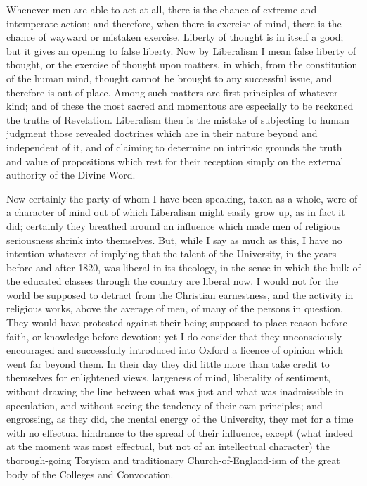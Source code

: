 Whenever men are able to act at all, there is the chance of extreme
and intemperate action; and therefore, when there is exercise of mind,
there is the chance of wayward or mistaken exercise. Liberty of thought
is in itself a good; but it gives an opening to false liberty. Now by
Liberalism I mean false liberty of thought, or the exercise of thought
upon matters, in which, from the constitution of the human mind, thought
cannot be brought to any successful issue, and therefore is out of
place. Among such matters are first principles of whatever kind; and of
these the most sacred and momentous are especially to be reckoned the
truths of Revelation. Liberalism then is the mistake of subjecting to
human judgment those revealed doctrines which are in their nature beyond
and independent of it, and of claiming to determine on intrinsic grounds
the truth and value of propositions which rest for their reception
simply on the external authority of the Divine Word.

Now certainly the party of whom I have been speaking, taken as a
whole, were of a character of mind out of which Liberalism might
easily grow up, as in fact it did; certainly they breathed around an
influence which made men of religious seriousness shrink into
themselves. But, while I say as much as this, I have no intention
whatever of implying that the talent of the University, in the years
before and after 1820, was liberal in its theology, in the sense in
which the bulk of the educated classes through the country are liberal
now. I would not for the world be supposed to detract from the Christian
earnestness, and the activity in religious works, above the average of
men, of many of the persons in question. They would have protested
against their being supposed to place reason before faith, or knowledge
before devotion; yet I do consider that they unconsciously encouraged
and successfully introduced into Oxford a licence of opinion which went
far beyond them. In their day they did little more than take credit to
themselves for enlightened views, largeness of mind, liberality of
sentiment, without drawing the line between what was just and what was
inadmissible in speculation, and without seeing the tendency of their
own principles; and engrossing, as they did, the mental energy of the
University, they met for a time with no effectual hindrance to the
spread of their influence, except (what indeed at the moment was most
effectual, but not of an intellectual character) the thorough-going
Toryism and traditionary Church-of-England-ism of the great body of the
Colleges and Convocation.

